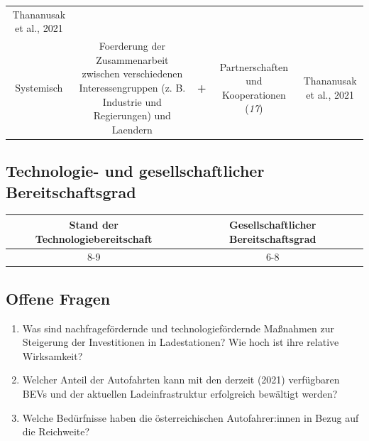 \documentclass[
]{book}
\providecommand{\tightlist}{%
  \setlength{\itemsep}{0pt}\setlength{\parskip}{0pt}}
\begin{document}
\begin{longtable}[]{@{}ccccc@{}}
\begin{minipage}[t]{0.17\columnwidth}
Thananusak et al., 2021\strut
\end{minipage}\tabularnewline
\begin{minipage}[t]{0.17\columnwidth}\centering
Systemisch\strut
\end{minipage} & \begin{minipage}[t]{0.16\columnwidth}\centering
Foerderung der Zusammenarbeit zwischen verschiedenen Interessengruppen (z. B. Industrie und Regierungen) und Laendern\strut
\end{minipage} & \begin{minipage}[t]{0.17\columnwidth}\centering
\textbf{+}\strut
\end{minipage} & \begin{minipage}[t]{0.17\columnwidth}\centering
Partnerschaften und Kooperationen (\emph{17})\strut
\end{minipage} & \begin{minipage}[t]{0.17\columnwidth}\centering
Thananusak et al., 2021\strut
\end{minipage}\tabularnewline
\bottomrule
\end{longtable}

\hypertarget{technologie--und-gesellschaftlicher-bereitschaftsgrad-6}{%
\subsection*{Technologie- und gesellschaftlicher Bereitschaftsgrad}\label{technologie--und-gesellschaftlicher-bereitschaftsgrad-6}}

\begin{longtable}[]{@{}cc@{}}
\toprule
Stand der Technologiebereitschaft & Gesellschaftlicher Bereitschaftsgrad\tabularnewline
\midrule
\endhead
8-9 & 6-8\tabularnewline
\bottomrule
\end{longtable}

\hypertarget{offene-fragen-8}{%
\subsection*{Offene Fragen}\label{offene-fragen-8}}

\begin{enumerate}
\def\labelenumi{\arabic{enumi}.}
\tightlist
\item
  Was sind nachfragefördernde und technologiefördernde Maßnahmen zur Steigerung der Investitionen in Ladestationen? Wie hoch ist ihre relative Wirksamkeit?
\item
  Welcher Anteil der Autofahrten kann mit den derzeit (2021) verfügbaren BEVs und der aktuellen Ladeinfrastruktur erfolgreich bewältigt werden?
\item
  Welche Bedürfnisse haben die österreichischen Autofahrer:innen in Bezug auf die Reichweite?
\end{enumerate}
\end{document}
